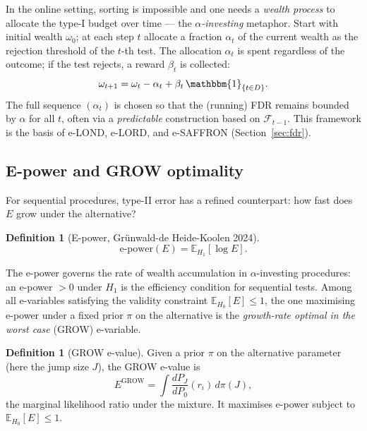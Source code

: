 \documentclass[11pt,a4paper]{article}
\theoremstyle{plain}
\theoremstyle{definition}
\newtheorem{definition}[theorem]{Definition}
\theoremstyle{remark}
\newcommand{\E}{\mathbb{E}}
\newcommand{\ind}{\mathbbm{1}}
\begin{document}
In the online setting, sorting is impossible and one needs a \emph{wealth
process} to allocate the type-I budget over time --- the \emph{$\alpha$-investing}
metaphor. Start with initial wealth $\omega_0$; at each step $t$ allocate a
fraction $\alpha_t$ of the current wealth as the rejection threshold of the
$t$-th test. The allocation $\alpha_t$ is spent regardless of the outcome;
if the test rejects, a reward $\beta_t$ is collected:
\begin{equation}\label{eq:investing}
  \omega_{t+1} = \omega_t - \alpha_t + \beta_t\,\ind_{\{t \in D\}}.
\end{equation}
The full sequence $(\alpha_t)$ is chosen so that the (running) FDR remains
bounded by $\alpha$ for all $t$, often via a \emph{predictable} construction
based on $\mathcal{F}_{t-1}$. This framework is the basis of e-LOND, e-LORD,
and e-SAFFRON (Section~\ref{sec:fdr}).

\subsection{E-power and GROW optimality}

For sequential procedures, type-II error has a refined counterpart: how fast
does $E$ grow under the alternative?

\begin{definition}[E-power, Gr\"unwald-de Heide-Koolen 2024]
\[
  \mathrm{e\text{-}power}(E) = \E_{H_1}[\log E].
\]
\end{definition}

The e-power governs the rate of wealth accumulation in $\alpha$-investing
procedures: an e-power $> 0$ under $H_1$ is the efficiency condition for
sequential tests. Among all e-variables satisfying the validity constraint
$\E_{H_0}[E] \le 1$, the one maximising e-power under a fixed prior $\pi$ on
the alternative is the \emph{growth-rate optimal in the worst case} (GROW)
e-variable.

\begin{definition}[GROW e-value]
Given a prior $\pi$ on the alternative parameter (here the jump size $J$),
the GROW e-value is
\[
  E^{\mathrm{GROW}} = \int \frac{dP_J}{dP_0}(r_i)\,d\pi(J),
\]
the marginal likelihood ratio under the mixture. It maximises e-power subject
to $\E_{H_0}[E] \leq 1$.
\end{definition}

\end{document}
